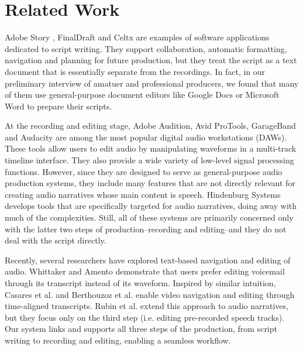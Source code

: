 \section{Related Work}

Adobe Story \cite{adobestory2016}, FinalDraft and Celtx are examples of software applications dedicated to script writing. They support collaboration, automatic formatting, navigation and planning for future production, but they treat the script as a text document that is essentially separate from the recordings. In fact, in our preliminary interview of amatuer and professional producers, we found that many of them use general-purpose document editors like Google Docs or Microsoft Word to prepare their scripts.

At the recording and editing stage, Adobe Audition, Avid ProTools, GarageBand and Audacity are among the most popular digital audio workstations (DAWs). These tools allow users to edit audio by manipulating waveforms in a multi-track timeline interface. They also provide a wide variety of low-level signal processing functions. However, since they are designed to serve as general-purpose audio production systems, they include many features that are not directly relevant for creating audio narratives whose main content is speech. Hindenburg Systems develops tools that are specifically targeted for audio narratives, doing away with much of the complexities. Still, all of these systems are primarily concerned only with the latter two steps of production--recording and editing--and they do not deal with the script directly.   

Recently, several researchers have explored text-based navigation and editing of audio. Whittaker and Amento \cite{whittaker2004semantic} demonstrate that users prefer editing voicemail through its transcript instead of its waveform. Inspired by similar intuition, Casares et al. \cite{casares2002simplifying} and Berthouzoz et al. \cite{berthouzoz2012tools} enable video navigation and editing through time-aligned transcripts. Rubin et al. \cite{rubin2013content} extend this approach to audio narratives, but they focus only on the third step (i.e. editing pre-recorded speech tracks). Our system links and supports all three steps of the production, from script writing to recording and editing, enabling a seamless workflow.       



